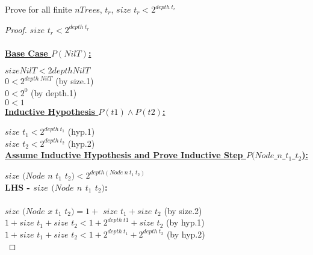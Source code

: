 \documentclass[paper=a4, fontsize=11pt]{scrartcl} %
\numberwithin{equation}{section} %
\numberwithin{figure}{section} %
\numberwithin{table}{section} %
\begin{document}
Prove for all finite $nTree$s, $t_r$, $size$ $t_r < 2^{depth \hspace{3pt} t_r}$\\

\begin{proof}
$size$ $t_r < 2^{depth \hspace{3pt} t_r}$\\
\\

\textbf{\underline{Base Case $P(NilT)$:}}

$size NilT < 2{depth NilT}$\\
$0 < 2^{depth \hspace{3pt} NilT}$       \hspace{300pt}                                      (by size.1)\\
$0 < 2^0$          \hspace{340pt}                                              (by depth.1)\\
$0 < 1$               \hspace{350pt}                \\

\textbf{\underline{Inductive Hypothesis $P(t1) \wedge P(t2)$:}}

 $size$ $t_1 < 2^{depth \hspace{3pt} t_1}$       \hspace{300pt}                                   (hyp.1)\\
 $size$ $t_2 < 2^{depth \hspace{3pt} t_2} $         \hspace{300pt}                               (hyp.2)\\

\textbf{\underline{Assume Inductive Hypothesis and Prove Inductive Step $P(Node$ $n$ $t_1$ $t_2$):}}

 $size$ $(Node$ $n$ $t_1$ $t_2) < 2^{depth (Node \hspace{3pt} n \hspace{3pt} t_1 \hspace{3pt} t_2)}$\\
 
 \textbf{LHS - $size$ $(Node$ $n$ $t_1$ $t_2)$:}\\
\\
 $size$ $(Node$ $x$ $t_1$ $t_2) = 1 +$ $size$ $t_1 + size$ $t_2$      \hspace{180pt}                                             (by size.2) \\
 $1 + size$ $t_1+ size$ $t_2  < 1 + 2^{depth\hspace{3pt} t1} + size$ $t_2$       \hspace{170pt}                                    (by hyp.1)\\
 $1 + size$ $t_1 + size$ $t_2  < 1 + 2^{depth \hspace{3pt} t_1} + 2^{depth \hspace{3pt} t_2}$     \hspace{168pt}                                 (by hyp.2)\\
  

\end{proof}
\end{document}
